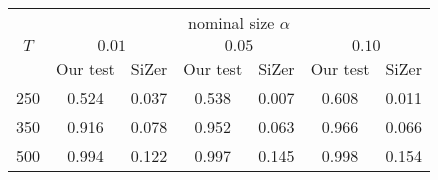 % 
\begin{tabular}{|c|cc|cc|cc|}
  \hline
  & \multicolumn{6}{|c|}{nominal size $\alpha$} \\
 \cline{2-7} $T$ & \multicolumn{2}{|c|}{$0.01$} & \multicolumn{2}{|c|}{$0.05$} & \multicolumn{2}{|c|}{$0.10$} \\
  & Our test & SiZer & Our test & SiZer & Our test & SiZer \\
 \hline
250 & 0.524 & 0.037 & 0.538 & 0.007 & 0.608 & 0.011 \\ 
  350 & 0.916 & 0.078 & 0.952 & 0.063 & 0.966 & 0.066 \\ 
  500 & 0.994 & 0.122 & 0.997 & 0.145 & 0.998 & 0.154 \\ 
   \hline
\end{tabular}
